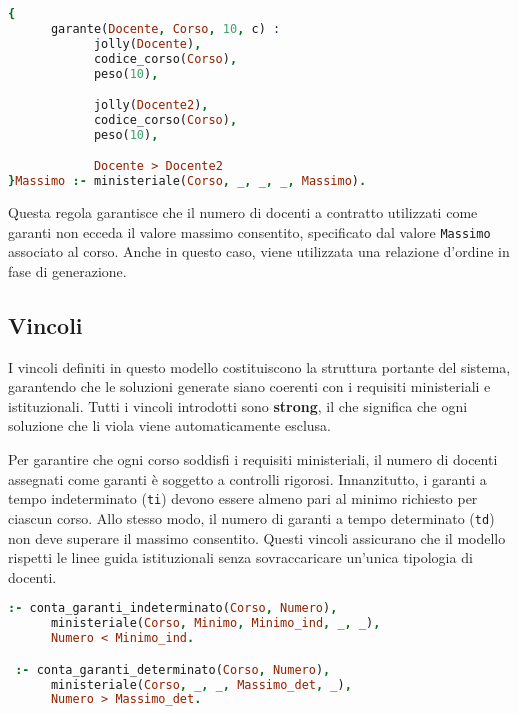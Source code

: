 \begin{lstlisting}[language=prolog, caption=Generazione dei garanti a contratto.]
{     
      garante(Docente, Corso, 10, c) :
            jolly(Docente),
            codice_corso(Corso),
            peso(10),

            jolly(Docente2),
            codice_corso(Corso),
            peso(10),

            Docente > Docente2
}Massimo :- ministeriale(Corso, _, _, _, Massimo).
\end{lstlisting}

Questa regola garantisce che il numero di docenti a contratto utilizzati come garanti non ecceda il 
valore massimo consentito, specificato dal valore \texttt{Massimo} associato al corso. Anche in questo 
caso, viene utilizzata una relazione d'ordine in fase di generazione.


\subsection{Vincoli}\label{sec:constraints}

I vincoli definiti in questo modello costituiscono la struttura portante del sistema, garantendo 
che le soluzioni generate siano coerenti con i requisiti ministeriali e istituzionali. 
Tutti i vincoli introdotti sono \textbf{strong}, il che significa che ogni soluzione che li 
viola viene automaticamente esclusa. 

Per garantire che ogni corso soddisfi i requisiti ministeriali, il numero di docenti assegnati 
come garanti è soggetto a controlli rigorosi. Innanzitutto, i garanti a tempo indeterminato 
(\texttt{ti}) devono essere almeno pari al minimo richiesto per ciascun corso. Allo stesso modo, 
il numero di garanti a tempo determinato (\texttt{td}) non deve superare il massimo consentito. 
Questi vincoli assicurano che il modello rispetti le linee guida istituzionali senza 
sovraccaricare un'unica tipologia di docenti.

\begin{lstlisting}[language=prolog, caption={Vincoli su garanti a tempo indeterminato e determinato.}]
 :- conta_garanti_indeterminato(Corso, Numero),
      ministeriale(Corso, Minimo, Minimo_ind, _, _),
      Numero < Minimo_ind.

 :- conta_garanti_determinato(Corso, Numero),
      ministeriale(Corso, _, _, Massimo_det, _),
      Numero > Massimo_det.
\end{lstlisting}

